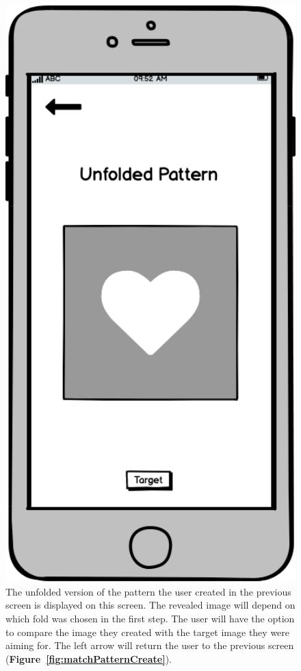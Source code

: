 \documentclass[11pt]{article}
\begin{document}
            \begin{figure}
                \begin{minipage}[c]{0.65\textwidth}
                \caption{The unfolded version of the pattern the user created in the previous screen is displayed on this screen. The revealed image will depend on which fold was chosen in the first step. The user will have the option to compare the image they created with the target image they were aiming for. The left arrow will return the user to the previous screen (\textbf{Figure~\ref{fig:matchPatternCreate}}).}
                \label{fig:revealWithOverlay}
                \end{minipage}\hfill
                \begin{minipage}[c]{0.35\textwidth}
                \includegraphics[width=1\textwidth]{Images/Prototype/prototypeRevealWithOverlay}

\end{minipage}
\end{figure}
\end{document}
